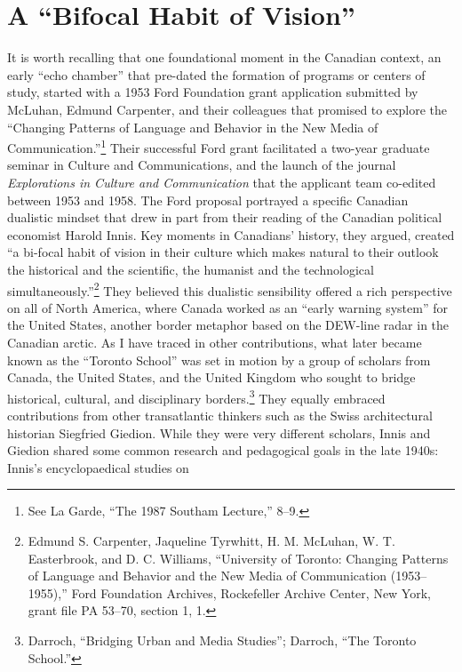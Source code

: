 \documentclass{tufte-handout}
\begin{document}
\hypertarget{a-bifocal-habit-of-vision}{%
\section{A ``Bifocal Habit of
Vision''}\label{a-bifocal-habit-of-vision}}

It is worth recalling that one foundational moment in the Canadian
context, an early ``echo chamber'' that pre-dated the formation of
programs or centers of study, started with a 1953 Ford Foundation grant
application submitted by McLuhan, Edmund Carpenter, and their colleagues
that promised to explore the ``Changing Patterns of Language and
Behavior in the New Media of Communication.''\footnote{See La Garde,
  ``The 1987 Southam Lecture,'' 8--9.} Their successful Ford grant
facilitated a two-year graduate seminar in Culture and Communications,
and the launch of the journal \emph{Explorations in Culture and
Communication} that the applicant team co-edited between 1953 and 1958.
The Ford proposal portrayed a specific Canadian dualistic mindset that
drew in part from their reading of the Canadian political economist
Harold Innis. Key moments in Canadians' history, they argued, created
``a bi-focal habit of vision in their culture which makes natural to
their outlook the historical and the scientific, the humanist and the
technological simultaneously.''\footnote{Edmund S. Carpenter, Jaqueline
  Tyrwhitt, H. M. McLuhan, W. T. Easterbrook, and D. C. Williams,
  ``University of Toronto: Changing Patterns of Language and Behavior
  and the New Media of Communication (1953--1955),'' Ford Foundation
  Archives, Rockefeller Archive Center, New York, grant file PA 53--70,
  section 1, 1.} They believed this dualistic sensibility offered a rich
perspective on all of North America, where Canada worked as an ``early
warning system'' for the United States, another border metaphor based on
the DEW-line radar in the Canadian arctic. As I have traced in other
contributions, what later became known as the ``Toronto School'' was set
in motion by a group of scholars from Canada, the United States, and the
United Kingdom who sought to bridge historical, cultural, and
disciplinary borders.\footnote{Darroch, ``Bridging Urban and Media
  Studies''; Darroch, ``The Toronto School.''} They equally embraced
contributions from other transatlantic thinkers such as the Swiss
architectural historian Siegfried Giedion. While they were very
different scholars, Innis and Giedion shared some common research and
pedagogical goals in the late 1940s: Innis's encyclopaedical studies on
\end{document}
